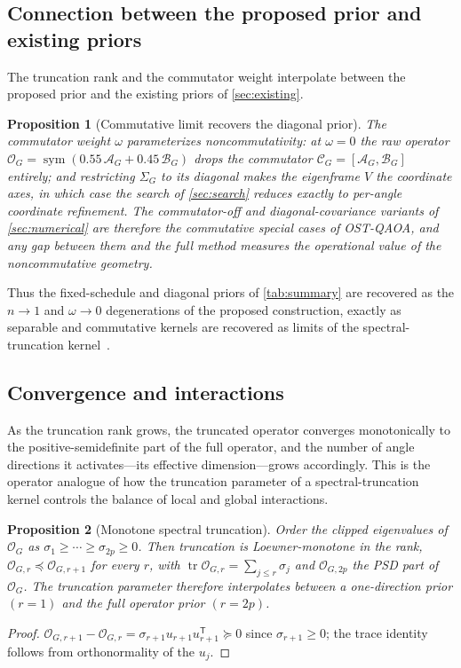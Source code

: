 \documentclass[aps,prxquantum,reprint,amsmath,amssymb,floatfix,nofootinbib,superscriptaddress,longbibliography]{revtex4-2}
\newtheorem{proposition}{Proposition}
\theoremstyle{remark}
\newcommand{\OSTQAOA}{\textnormal{\textsc{OST-QAOA}}}
\newcommand{\calO}{\mathcal{O}}
\newcommand{\calA}{\mathcal{A}}
\newcommand{\calB}{\mathcal{B}}
\newcommand{\calC}{\mathcal{C}}
\begin{document}
\subsection{Connection between the proposed prior and existing priors}
\label{sec:connection}

The truncation rank and the commutator weight interpolate between the proposed
prior and the existing priors of \cref{sec:existing}.

\begin{proposition}[Commutative limit recovers the diagonal prior]
\label{prop:limit}
The commutator weight \(\omega\) parameterizes noncommutativity: at \(\omega=0\)
the raw operator \(\calO_G=\operatorname{sym}(0.55\,\calA_G+0.45\,\calB_G)\) drops
the commutator \(\calC_G=[\calA_G,\calB_G]\) entirely; and restricting
\(\Sigma_G\) to its diagonal makes the eigenframe \(V\) the coordinate axes, in
which case the search of \cref{sec:search} reduces exactly to per-angle
coordinate refinement.  The commutator-off and diagonal-covariance variants of
\cref{sec:numerical} are therefore the commutative special cases of \OSTQAOA{},
and any gap between them and the full method measures the operational value of the
noncommutative geometry.
\end{proposition}

Thus the fixed-schedule and diagonal priors of \cref{tab:summary} are recovered
as the \(n\to1\) and \(\omega\to0\) degenerations of the proposed construction,
exactly as separable and commutative kernels are recovered as limits of the
spectral-truncation kernel~\cite{hashimoto2024spectral}.

\subsection{Convergence and interactions}
\label{sec:convergence}

As the truncation rank grows, the truncated operator converges monotonically to
the positive-semidefinite part of the full operator, and the number of angle
directions it activates---its effective dimension---grows accordingly.  This is
the operator analogue of how the truncation parameter of a spectral-truncation
kernel controls the balance of local and global interactions.

\begin{proposition}[Monotone spectral truncation]
\label{prop:mono}
Order the clipped eigenvalues of \(\calO_G\) as
\(\sigma_1\ge\cdots\ge\sigma_{2p}\ge0\).  Then truncation is Loewner-monotone in
the rank, \(\calO_{G,r}\preceq\calO_{G,r+1}\) for every \(r\), with
\(\operatorname{tr}\calO_{G,r}=\sum_{j\le r}\sigma_j\) and \(\calO_{G,2p}\) the
PSD part of \(\calO_G\).  The truncation parameter therefore interpolates between
a one-direction prior \((r{=}1)\) and the full operator prior \((r{=}2p)\).
\end{proposition}
\begin{proof}
\(\calO_{G,r+1}-\calO_{G,r}=\sigma_{r+1}u_{r+1}u_{r+1}^{\mathsf T}\succeq0\) since
\(\sigma_{r+1}\ge0\); the trace identity follows from orthonormality of the
\(u_j\).
\end{proof}
\end{document}
